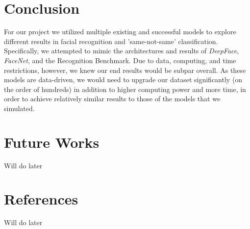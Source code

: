 \documentclass[11pt]{article}
\begin{document}
\section{Conclusion}
    \par
    For our project we utilized multiple existing and successful models to explore different results in facial recognition and 'same-not-same' classification. Specifically, we attempted to mimic the architectures and results of \textit{DeepFace}, \textit{FaceNet}, and the Recognition Benchmark. Due to data, computing, and time restrictions, however, we knew our end results would be subpar overall. As these models are data-driven, we would need to upgrade our dataset significantly (on the order of hundreds) in addition to higher computing power and more time, in order to achieve relatively similar results to those of the models that we simulated. 
\section{Future Works} Will do later
\section{References}

Will do later
\end{document}
